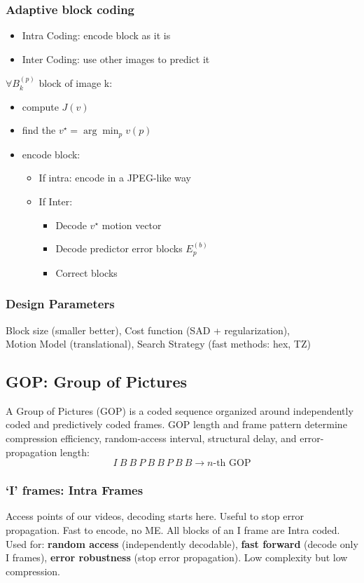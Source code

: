 \subsubsection{Adaptive block coding}
\begin{itemize}
    \item Intra Coding: encode block as it is
    \item Inter Coding: use other images to predict it
\end{itemize}
$\forall B_k^{(p)}$ block of image k:
\begin{itemize}
    \item compute $J(v)$
    \item find the $v^\star = \arg\min_pv(p)$
    \item encode block:
    \begin{itemize}
        \item If intra: encode in a JPEG-like way
        \item If Inter:
        \begin{itemize}
            \item Decode $v^\star$ motion vector
            \item Decode predictor error blocks $E_p^{(b)}$
            \item Correct blocks
        \end{itemize}
    \end{itemize}
\end{itemize}
\subsubsection{Design Parameters}
Block size (smaller better), Cost function (SAD + regularization),\\
Motion Model (translational), Search Strategy (fast methods: hex, TZ)
\subsection{GOP: Group of Pictures}
A Group of Pictures (GOP) is a coded sequence organized around independently coded and predictively coded frames. GOP length and frame pattern determine compression efficiency, random-access interval, structural delay, and error-propagation length:
$$\boxed{\boxed{I}\ \boxed{B}\ \boxed{B}\ \boxed{P}\ \boxed{B}\ \boxed{B}\ \boxed{P}\ \boxed{B}\ \boxed{B}} \to n\text{-th GOP}$$
\subsubsection{`I' frames: Intra Frames}
Access points of our videos, decoding starts here. Useful to stop error propagation. Fast to encode, no ME.
All blocks of an I frame are Intra coded. Used for: \textbf{random access} (independently decodable), \textbf{fast forward} (decode only I frames), \textbf{error robustness} (stop error propagation). Low complexity but low compression.
